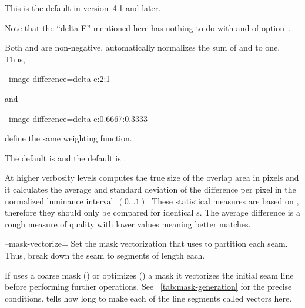 \begin{codelist}
\begin{codelist}
    This is the default in \App{} version~4.1 and later.

    Note that the ``delta-E'' mentioned here has nothing to do with  and
     of option~.
  \end{codelist}

  \begin{sloppypar}
    Both  and  are non-negative.
    \App{} automatically normalizes the sum of  and
     to one.  Thus,
  \end{sloppypar}

  \begin{literal}
    --image-difference=delta-e:2:1
  \end{literal}

  and

  \begin{literal}
    --image-difference=delta-e:0.6667:0.3333
  \end{literal}

  define the same weighting function.

  The default  is 
  and the default  is
  .

  At higher verbosity levels \App{} computes the true size of the overlap area in pixels and it
  calculates the average and standard deviation of the difference per pixel in the normalized
  luminance interval~$(0\dots1)$.  These statistical measures are based on ,
  therefore they should only be compared for identical s.  The average
  difference is a rough measure of quality with lower values meaning better matches.


  \label{opt:mask-vectorize}%
\item[--mask-vectorize=\metavar{DISTANCE}]\itemend
  Set the mask vectorization  that \App{} uses to partition each seam.  Thus,
  break down the seam to segments of length  each.

  If \App{} uses a coarse mask () or \App{} optimizes
  () a mask it vectorizes the initial seam line before performing further
  operations.  See \tableName~\ref{tab:mask-generation} for the precise conditions.
   tells \App{} how long to make each of the line segments called vectors
  here.


\end{codelist}
